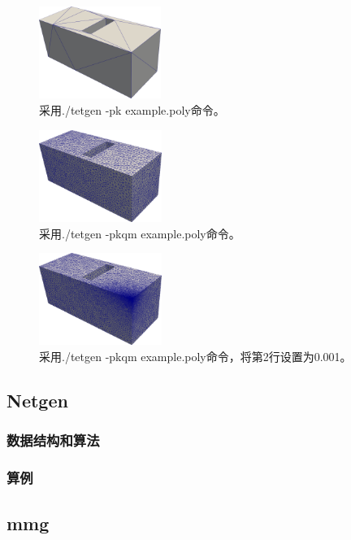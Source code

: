 \begin{figure}[!htbp]
  \centering
  \includegraphics[height=3cm]{fig/1/19.png}
  \caption{采用./tetgen -pk example.poly命令。}
  \label{fig:1-7}
\end{figure}

\begin{figure}[!htbp]
  \centering
  \includegraphics[height=3cm]{fig/1/17.png}
  \caption{采用./tetgen -pkqm example.poly命令。}
  \label{fig:1-7}
\end{figure}

\begin{figure}[!htbp]
  \centering
  \includegraphics[height=3cm]{fig/1/18.png}
  \caption{采用./tetgen -pkqm example.poly命令，将第2行设置为0.001。}
  \label{fig:1-7}
\end{figure}


\subsection{Netgen}

\subsubsection{数据结构和算法}

\subsubsection{算例}

\subsection{mmg}

